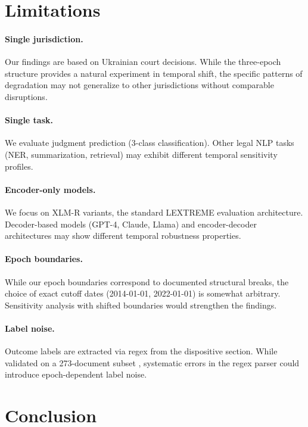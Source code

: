 \documentclass[11pt]{article}
\begin{document}
\section{Limitations}

\paragraph{Single jurisdiction.}
Our findings are based on Ukrainian court decisions. While the three-epoch structure provides a natural experiment in temporal shift, the specific patterns of degradation may not generalize to other jurisdictions without comparable disruptions.

\paragraph{Single task.}
We evaluate judgment prediction (3-class classification). Other legal NLP tasks (NER, summarization, retrieval) may exhibit different temporal sensitivity profiles.

\paragraph{Encoder-only models.}
We focus on XLM-R variants, the standard LEXTREME evaluation architecture. Decoder-based models (GPT-4, Claude, Llama) and encoder-decoder architectures may show different temporal robustness properties.

\paragraph{Epoch boundaries.}
While our epoch boundaries correspond to documented structural breaks, the choice of exact cutoff dates (2014-01-01, 2022-01-01) is somewhat arbitrary. Sensitivity analysis with shifted boundaries would strengthen the findings.

\paragraph{Label noise.}
Outcome labels are extracted via regex from the dispositive section. While validated on a 273-document subset \citep{ovcharov2025tokenizer}, systematic errors in the regex parser could introduce epoch-dependent label noise.

\section{Conclusion}
\end{document}
